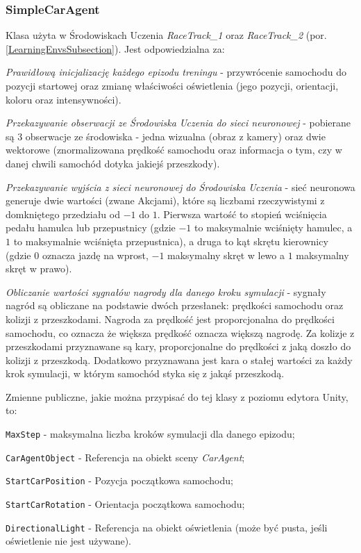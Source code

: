 \subsubsection{SimpleCarAgent}
Klasa użyta w Środowiskach Uczenia \textit{RaceTrack\_1} oraz \textit{RaceTrack\_2} (por. \ref{LearningEnvsSubsection}). Jest odpowiedzialna za:
\begin{enumerate*}
\item \textit{Prawidłową inicjalizację każdego epizodu treningu} - przywrócenie samochodu do pozycji startowej oraz zmianę właściwości oświetlenia (jego pozycji, orientacji, koloru oraz intensywności).
\item \textit{Przekazywanie obserwacji ze Środowiska Uczenia do sieci neuronowej} - pobierane są 3 obserwacje ze środowiska - jedna wizualna (obraz z kamery) oraz dwie wektorowe (znormalizowana prędkość samochodu oraz informacja o tym, czy w danej chwili samochód dotyka jakiejś przeszkody).
\item \textit{Przekazywanie wyjścia z sieci neuronowej do Środowiska Uczenia} - sieć neuronowa generuje dwie wartości (zwane Akcjami), które są liczbami rzeczywistymi z domkniętego przedziału od $-1$ do $1$. Pierwsza wartość to stopień wciśnięcia pedału hamulca lub przepustnicy (gdzie $-1$ to maksymalnie wciśnięty hamulec, a $1$ to maksymalnie wciśnięta przepustnica), a druga to kąt skrętu kierownicy (gdzie $0$ oznacza jazdę na wprost, $-1$ maksymalny skręt w lewo a $1$ maksymalny skręt w prawo).
\item \textit{Obliczanie wartości sygnałów nagrody dla danego kroku symulacji} - sygnały nagród są obliczane na podstawie dwóch przesłanek: prędkości samochodu oraz kolizji z przeszkodami. Nagroda za prędkość jest proporcjonalna do prędkości samochodu, co oznacza że większa prędkość oznacza większą nagrodę. Za kolizje z przeszkodami przyznawane są kary, proporcjonalne do prędkości z jaką doszło do kolizji z przeszkodą. Dodatkowo przyznawana jest kara o stałej wartości za każdy krok symulacji, w którym samochód styka się z jakąś przeszkodą.
\end{enumerate*}
\noindent
Zmienne publiczne, jakie można przypisać do tej klasy z poziomu edytora Unity, to:
\vspace*{-0.5cm}
\begin{itemize*}
\item \texttt{MaxStep} - maksymalna liczba kroków symulacji dla danego epizodu;
\item \texttt{CarAgentObject} - Referencja na obiekt sceny \textit{CarAgent};
\item \texttt{StartCarPosition} - Pozycja początkowa samochodu;
\item \texttt{StartCarRotation} - Orientacja początkowa samochodu;
\item \texttt{DirectionalLight} - Referencja na obiekt oświetlenia (może być pusta, jeśli oświetlenie nie jest używane).
\end{itemize*}


